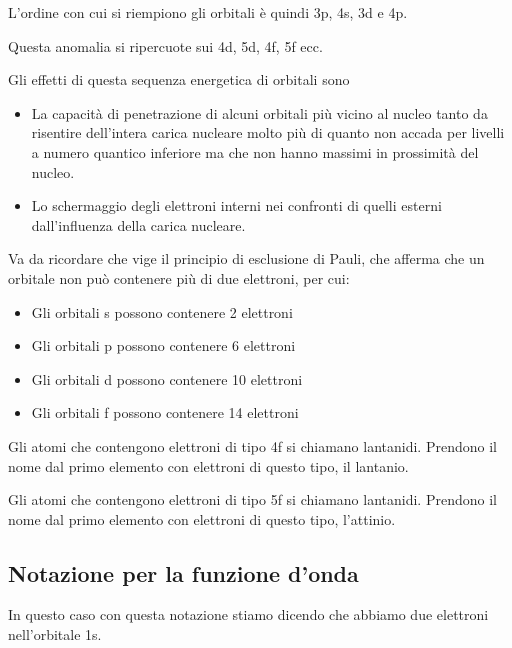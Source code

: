 L'ordine con cui si riempiono gli orbitali è quindi 3p, 4s, 3d e 4p.

Questa anomalia si ripercuote sui 4d, 5d, 4f, 5f ecc.

Gli effetti di questa sequenza energetica di orbitali sono
\begin{itemize}
  \item La capacità di penetrazione di alcuni orbitali più vicino al nucleo tanto da risentire dell'intera carica nucleare molto più di quanto non accada per livelli a numero quantico inferiore ma che non hanno massimi in prossimità del nucleo.
  \item Lo schermaggio degli elettroni interni nei confronti di quelli esterni dall'influenza della carica nucleare.
\end{itemize}
Va da ricordare che vige il principio di esclusione di Pauli, che afferma che un orbitale non può contenere più di due elettroni, per cui:
\begin{itemize}
  \item Gli orbitali s possono contenere 2 elettroni
  \item Gli orbitali p possono contenere 6 elettroni
  \item Gli orbitali d possono contenere 10 elettroni
  \item Gli orbitali f possono contenere 14 elettroni
\end{itemize}
Gli atomi che contengono elettroni di tipo 4f si chiamano lantanidi. Prendono il nome dal primo elemento con elettroni di questo tipo, il lantanio.

Gli atomi che contengono elettroni di tipo 5f si chiamano lantanidi. Prendono il nome dal primo elemento con elettroni di questo tipo, l'attinio.
\subsection{Notazione per la funzione d'onda}
In questo caso con questa notazione stiamo dicendo che abbiamo due elettroni nell'orbitale 1s.
